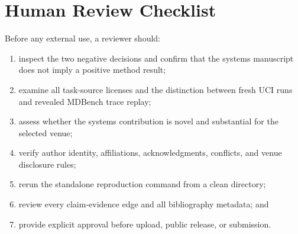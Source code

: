 \section{Human Review Checklist}

Before any external use, a reviewer should:

\begin{enumerate}
  \item inspect the two negative \routea{} decisions and confirm that the
  systems manuscript does not imply a positive method result;
  \item examine all task-source licenses and the distinction between fresh
  UCI runs and revealed MDBench trace replay;
  \item assess whether the systems contribution is novel and substantial for
  the selected venue;
  \item verify author identity, affiliations, acknowledgments, conflicts, and
  venue disclosure rules;
  \item rerun the standalone reproduction command from a clean directory;
  \item review every claim-evidence edge and all bibliography metadata; and
  \item provide explicit approval before upload, public release, or
  submission.
\end{enumerate}
